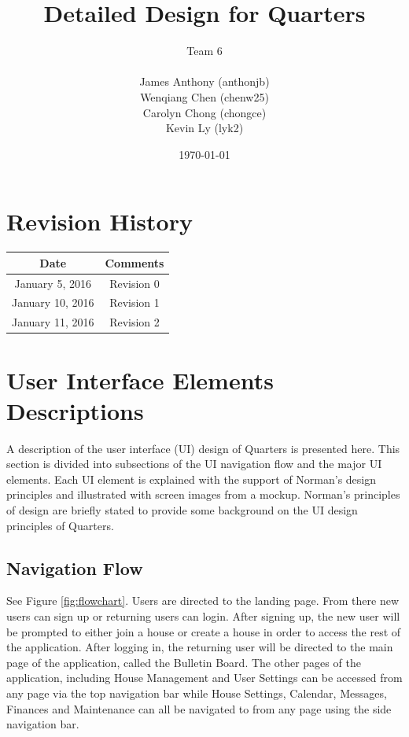 \documentclass[12pt]{article}
\begin{document}
\title{Detailed Design for Quarters}
\author{Team 6\\ \\James Anthony (anthonjb)\\ Wenqiang Chen (chenw25)\\ Carolyn Chong
(chongce)\\ Kevin Ly (lyk2)}
\date{\today}

\maketitle

\pagebreak

\tableofcontents
\listoffigures

\section*{Revision History}
\begin{tabular}{|c|c|}
\hline
\textbf{Date}  & \textbf{Comments} \\ \hline
January 5, 2016 & Revision 0 \\ \hline
January 10, 2016 & Revision 1\\ \hline
January 11, 2016 & Revision 2\\
\hline
\end{tabular}

\pagebreak


\section{User Interface Elements Descriptions}

A description of the user interface (UI) design of Quarters is presented here. This section is divided into subsections of the UI navigation flow and the major UI elements. Each UI element is explained with the support of Norman's design principles and illustrated with screen images from a mockup. Norman's principles of design are briefly stated to provide some background on the UI design principles of Quarters.

\subsection{Navigation Flow}
See Figure \ref{fig:flowchart}. Users are directed to the landing page. From there new users can sign up or returning users can login. After signing up, the new user will be prompted to either join a house or create a house in order to access the rest of the application. After logging in, the returning user will be directed to the main page of the application, called the Bulletin Board. The other pages of the application, including House Management and User Settings can be accessed from any page via the top navigation bar while House Settings, Calendar, Messages, Finances and Maintenance can all be navigated to from any page using the side navigation bar.\\
\end{document}

